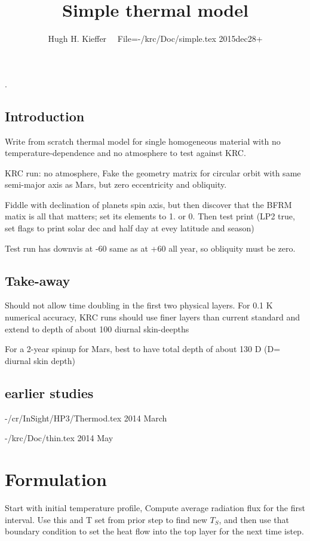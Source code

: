\documentclass{article}
\title{Simple thermal model}
\author{Hugh H. Kieffer  \ \ File=-/krc/Doc/simple.tex  2015dec28+}
\begin{document}
\maketitle
\tableofcontents
\listoffigures
\listoftables
\hrulefill .\hrulefill
\subsection{Introduction}
Write from scratch thermal model for single homogeneous material
with no temperature-dependence and no atmosphere to test against KRC.

 KRC run: no atmosphere, Fake the geometry matrix for circular orbit with same semi-major axis as Mars, but zero eccentricity and obliquity.

 Fiddle with declination of planets spin axis, but then discover that the BFRM matix is all that matters; set its elements to 1. or 0. Then test print (LP2 true, set flags to print solar dec and half day at evey latitude and season) 

 Test run has downvis at -60 same as at +60 all year, so obliquity must be zero.

\subsection{Take-away}
Should not allow time doubling in the first two physical layers.
For 0.1 K numerical accuracy, KRC runs should use finer layers than current standard and extend to depth of about 100 diurnal skin-deepths

For a 2-year spinup for Mars, best to have total depth of about 130 D (D= diurnal skin depth) 

\subsection{earlier studies}
-/cr/InSight/HP3/Thermod.tex  2014 March

-/krc/Doc/thin.tex  2014 May

\section{Formulation} 

Start with initial temperature profile, Compute average radiation flux for the first interval. Use this and T set from prior step to find new $T_S$, and then use that boundary condition to set the heat flow into the top layer for the next time istep.
\end{document}
